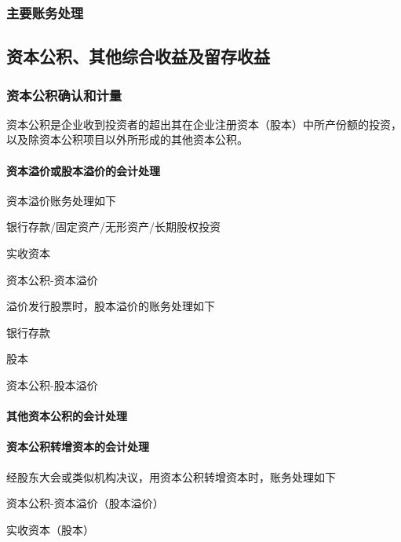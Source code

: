 \documentclass[UTF8,12pt]{ctexart}
\newenvironment{Dr}{%
	\begin{list}{}%
		{
			\setlength{\leftmargin}{2em}
			\setlength{\labelwidth}{2em}
			\setlength{\labelsep}{0pt}
			\setlength{\itemindent}{0pt}
			\setlength{\listparindent}{0pt}
			\setlength{\parsep}{0pt}
			\setlength{\topsep}{0pt}
		}
		\item[\textbf{借：}]
	}{%
	\end{list}
}
\newenvironment{Cr}{%
	\begin{list}{}%
		{
			\setlength{\leftmargin}{2em}
			\setlength{\labelwidth}{2em}
			\setlength{\labelsep}{0pt}
			\setlength{\itemindent}{0pt}
			\setlength{\listparindent}{0pt}
			\setlength{\parsep}{0pt}
			\setlength{\topsep}{0pt}
		}
		\item[\textbf{贷：}]
	}{%
	\end{list}
}
\numberwithin{equation}{section} %
\numberwithin{figure}{section}
\numberwithin{table}{section}
\begin{document}
	\subsubsection{主要账务处理}
	
	\subsection{资本公积、其他综合收益及留存收益}
	
	\subsubsection{资本公积确认和计量}
	资本公积是企业收到投资者的超出其在企业注册资本（股本）中所产份额的投资，以及除资本公积项目以外所形成的其他资本公积。
	
	\paragraph{资本溢价或股本溢价的会计处理}
	资本溢价账务处理如下
	
	\begin{Dr}
		银行存款/固定资产/无形资产/长期股权投资
	\end{Dr}
	\begin{Cr}
		实收资本
		
		资本公积-资本溢价
	\end{Cr}
	
	溢价发行股票时，股本溢价的账务处理如下
	
	\begin{Dr}
		银行存款
	\end{Dr}
	\begin{Cr}
		股本
		
		资本公积-股本溢价
	\end{Cr}
	
	\paragraph{其他资本公积的会计处理}
	
	\paragraph{资本公积转增资本的会计处理}
	
	经股东大会或类似机构决议，用资本公积转增资本时，账务处理如下
	
	\begin{Dr}
		资本公积-资本溢价（股本溢价）
	\end{Dr}
	\begin{Cr}
		实收资本（股本）
	\end{Cr}
	
\end{document}
